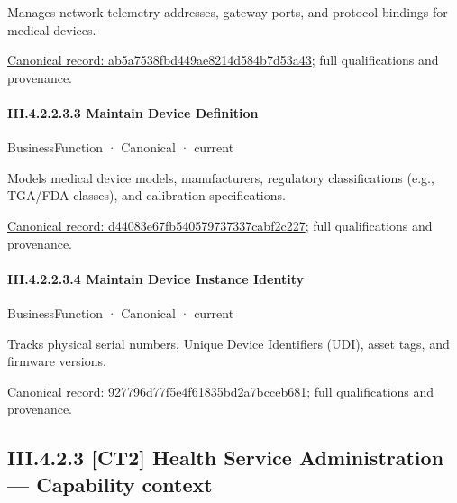 Manages network telemetry addresses, gateway ports, and protocol bindings for medical devices.


{\footnotesize \href{../../../../continuum/business/business-function/ab5a7538fbd449ae8214d584b7d53a43.md}{Canonical record: ab5a7538fbd449ae8214d584b7d53a43}; full qualifications and provenance.}\par
\paragraph*{III.4.2.2.3.3 Maintain Device Definition}
\label{navigation:III.4.2.2.3.3}

\label{element:d44083e67fb540579737337cabf2c227}
{\small BusinessFunction · Canonical · current}\par

Models medical device models, manufacturers, regulatory classifications (e.g., TGA/FDA classes), and calibration specifications.


{\footnotesize \href{../../../../continuum/business/business-function/d44083e67fb540579737337cabf2c227.md}{Canonical record: d44083e67fb540579737337cabf2c227}; full qualifications and provenance.}\par
\paragraph*{III.4.2.2.3.4 Maintain Device Instance Identity}
\label{navigation:III.4.2.2.3.4}

\label{element:927796d77f5e4f61835bd2a7bcceb681}
{\small BusinessFunction · Canonical · current}\par

Tracks physical serial numbers, Unique Device Identifiers (UDI), asset tags, and firmware versions.


{\footnotesize \href{../../../../continuum/business/business-function/927796d77f5e4f61835bd2a7bcceb681.md}{Canonical record: 927796d77f5e4f61835bd2a7bcceb681}; full qualifications and provenance.}\par
\subsection*{III.4.2.3 [CT2] Health Service Administration — Capability context}
\label{navigation:III.4.2.3}

